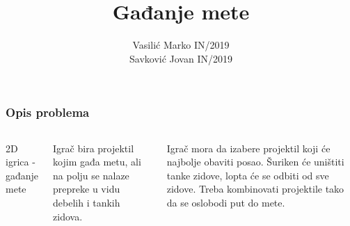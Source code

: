 \documentclass{beamer}
\title{Gađanje mete}
\author{Vasilić Marko IN/2019\\ Savković Jovan IN/2019}
\date{}
\begin{document}
\frame{\titlepage}

\begin{frame}
	\frametitle{Opis problema}

	\begin{columns}
		2D igrica - gađanje mete
		
		Igrač bira projektil kojim gađa metu, ali na polju se nalaze prepreke u vidu debelih i tankih zidova.

		Igrač mora da izabere projektil koji će najbolje obaviti posao. Šuriken će uništiti tanke zidove, lopta će se odbiti od sve zidove. Treba kombinovati projektile tako da se oslobodi put do mete.
		
	\end{columns}
\end{frame}
\end{document}
